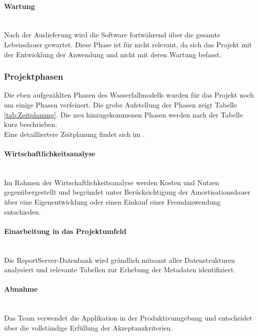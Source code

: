 \paragraph{Wartung} ~\\
\label{p:Wartung}
Nach der Auslieferung wird die Software fortwährend über die gesamte Lebensdauer gewartet. Diese Phase ist für \projektName nicht relevant, da sich das Projekt mit der Entwicklung der Anwendung und nicht mit deren Wartung befasst.

\subsubsection{Projektphasen}
\label{sec:Projektphasen}
Die eben aufgezählten Phasen des Wasserfallmodells wurden für das Projekt noch um einige Phasen verfeinert. Die grobe Aufstellung der Phasen zeigt Tabelle \ref{tab:Zeitplanung}. Die neu hinzugekommenen Phasen werden nach der Tabelle kurz beschrieben.
\\
Eine detailliertere Zeitplanung findet sich im .

\paragraph{Wirtschaftlichkeitsanalyse} ~\\
\label{p:Wirtschaftlichkeitsanalyse}
Im Rahmen der Wirtschaftlichkeitsanalyse werden Kosten und Nutzen gegenübergestellt und begründet unter Berücksichtigung der Amortisationsdauer über eine Eigenentwicklung oder einen Einkauf einer Fremdanwendung entschieden.

\paragraph{Einarbeitung in das Projektumfeld} ~\\
\label{p:EinarbeitungProjektumfeld}
Die ReportServer-Datenbank wird gründlich mitsamt aller Datenstrukturen analysiert und relevante Tabellen zur Erhebung der Metadaten identifiziert.

\paragraph{Abnahme} ~\\
\label{p:Abnahme}
Das Team \teamName verwendet die Applikation in der Produktivumgebung und entscheidet über die vollständige Erfüllung der Akzeptanzkriterien.

